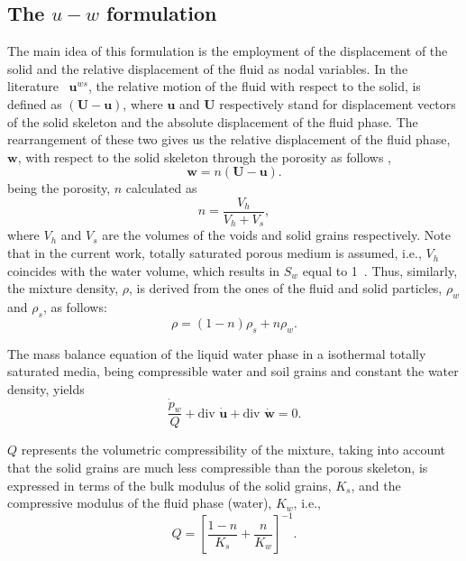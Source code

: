 \documentclass[preprint,12pt,a4paper]{elsarticle}
\begin{document}
\subsection{The $u-w$ formulation}
\label{subsec:21}
The main idea of this formulation is the employment of the displacement of the solid and the relative displacement of the fluid as nodal variables. In the literature~\cite{LewisSchrefler98} $\boldsymbol{u}^{ws}$, the relative motion of the fluid with respect to the solid, is defined as $\boldsymbol{  \left(U-u\right) }$, where $\boldsymbol{u}$ and  $\boldsymbol{U}$ respectively stand for displacement vectors of the solid skeleton and the absolute displacement of the fluid phase. The rearrangement of these two gives us the relative displacement of the fluid phase, $\boldsymbol{w}$, with respect to the solid skeleton through the porosity as follows \cite{LopezQuerol2008},
\begin{equation}\label{eq_uw1}
\boldsymbol{ w }=n \boldsymbol{  \left(U-u\right) }.
\end{equation}
being the porosity, $n$ calculated as
\begin{equation}\label{eq_uw3}
n= \frac{V_h}{V_h+V_s},
\end{equation}
where $V_h$ and $V_s$ are the volumes of the voids and solid grains respectively. 
Note that in the current work,   totally saturated porous medium is assumed, i.e., $V_h$ coincides with the water volume, which results in  $S_w$ equal to 1~\cite{LewisSchrefler98}. Thus, similarly, the mixture density, $\rho$, is derived from the ones of the fluid and solid particles, $\rho_w$ and $\rho_s$, as follows:
\begin{equation}\label{eq_uw2}
\rho=(1-n) \rho_s + n \rho_{w}.
\end{equation}

The mass balance equation of the liquid water phase in a isothermal totally saturated media, being compressible water and soil grains and constant the water density, yields ~\cite{LewisSchrefler98}
\begin{equation}
\frac{\dot{ p}_w}{Q} +  \mbox{div }  \boldsymbol{\dot{u}} + \mbox{div } \boldsymbol{\dot{w}} = 0 \label{eq_uw10}.
\end{equation}

  $Q$ represents the volumetric compressibility of the mixture, taking into account that the solid grains are much less compressible than the porous skeleton, is expressed in terms of the bulk modulus of the solid grains, $K_s$, and the compressive modulus of the fluid phase (water), $K_w$, \cite{Zienkiewicz99} i.e.,
 \begin{equation}\label{eq_uw4}
Q = \left[ \frac{1-n}{K_s} + \frac{n}{K_w} \right]^{-1}.
\end{equation}
\end{document}
